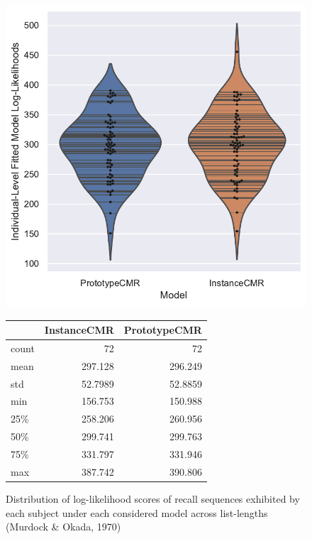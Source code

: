 \documentclass[
  letterpaper,
  DIV=11]{article}
\begin{document}
\begin{figure}

\begin{minipage}[c]{1.00\linewidth}

{\centering 

\includegraphics{./figures/individual_murdock1970.pdf}

}

\end{minipage}%
\newline
\begin{minipage}[c]{1.00\linewidth}

{\centering 

\begin{longtable}[]{@{}lrr@{}}
\toprule
& InstanceCMR & PrototypeCMR \\
\midrule
\endhead
count & 72 & 72 \\
mean & 297.128 & 296.249 \\
std & 52.7989 & 52.8859 \\
min & 156.753 & 150.988 \\
25\% & 258.206 & 260.956 \\
50\% & 299.741 & 299.763 \\
75\% & 331.797 & 331.946 \\
max & 387.742 & 390.806 \\
\bottomrule
\end{longtable}

}

\end{minipage}%

\caption{\label{fig-murdokafits}Distribution of log-likelihood scores of
recall sequences exhibited by each subject under each considered model
across list-lengths (Murdock \& Okada, 1970)}

\end{figure}
\end{document}
